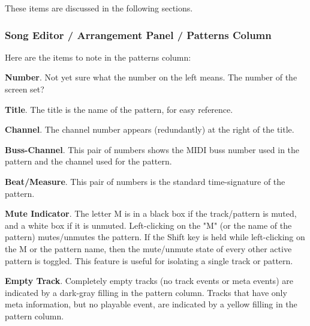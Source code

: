    These items are discussed in the following sections.

\subsubsection{Song Editor / Arrangement Panel / Patterns Column}
\label{subsubsec:seq66_song_editor_arrangement_panel_patterns_column}

   Here are the items to note in the patterns column:

   \begin{enumber}
      \item \textbf{Number}.
         Not yet sure what the number on the left means.
         The number of the screen set?
      \item \textbf{Title}.
         The title is the name of the pattern, for easy reference.
      \item \textbf{Channel}.
         The channel number appears (redundantly)
         at the right of the title.
      \item \textbf{Buss-Channel}.
         This pair of numbers shows the MIDI buss number used in the pattern
         and the channel used for the pattern.
      \item \textbf{Beat/Measure}.
         This pair of numbers is the standard time-signature of the pattern.
      \item \textbf{Mute Indicator}.
         The letter M is in a black box if the track/pattern is muted, and a
         white box if it is unmuted.
         Left-clicking on the "M" (or the name of the pattern)
         mutes/unmutes the pattern.
         If the Shift key is held while left-clicking on the M or the pattern
         name, then
         the mute/unmute state of every other active pattern is toggled.
         This feature is useful for isolating a single track or pattern.
      \item \textbf{Empty Track}.
         Completely empty tracks (no track events or meta events)
         are indicated by a dark-gray filling in the pattern column.
         Tracks that have only meta information, but no playable event, are
         indicated by a yellow filling in the pattern column.
   \end{enumber}

